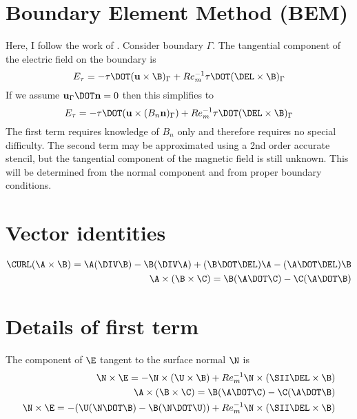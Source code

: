 \documentclass[11pt]{article}
\begin{document}
\doublespacing
\MOONSTITLE

\section{Boundary Element Method (BEM)}
Here, I follow the work of \cite{Iskakov2004}. Consider boundary $\Gamma$. The tangential component of the electric field on the boundary is
\begin{equation}
  E_{\tau} = -\mathbf{\tau} \DOT (\mathbf{u} \times \B)_{\Gamma} +
  Re_m^{-1} \mathbf{\tau} \DOT (\DEL \times \B)_{\Gamma}
\end{equation}
If we assume $\mathbf{u}_{\Gamma} \DOT \mathbf{n} = 0$ then this simplifies to
\begin{equation}
  E_{\tau} = -\mathbf{\tau} \DOT (\mathbf{u} \times (B_n \mathbf{n})_{\Gamma}) +
  Re_m^{-1} \mathbf{\tau} \DOT (\DEL \times \B)_{\Gamma}
\end{equation}
The first term requires knowledge of $B_n$ only and therefore requires no special difficulty. The second term may be approximated using a 2nd order accurate stencil, but the tangential component of the magnetic field is still unknown. This will be determined from the normal component and from proper boundary conditions.

\section{Vector identities}
\begin{equation}\begin{aligned}
  \CURL (\A \times \B) = \A (\DIV \B) - \B (\DIV \A) + (\B \DOT \DEL)\A - (\A \DOT \DEL)\B \\
  \A \times (\B \times \C) = \B (\A \DOT \C) - \C (\A \DOT \B)
\end{aligned}\end{equation}

\section{Details of first term}
The component of $\E$ tangent to the surface normal $\N$ is
\begin{equation}\begin{aligned}
  \N \times \E = -\N \times (\U \times \B) + Re_m^{-1} \N \times (\SII \DEL \times \B) \\
  \A \times (\B \times \C) = \B (\A \DOT \C) - \C (\A \DOT \B) \\
  \N \times \E = -(\U (\N \DOT \B) - \B (\N \DOT \U)) + Re_m^{-1} \N \times (\SII \DEL \times \B) \\
\end{aligned}\end{equation}
\end{document}
